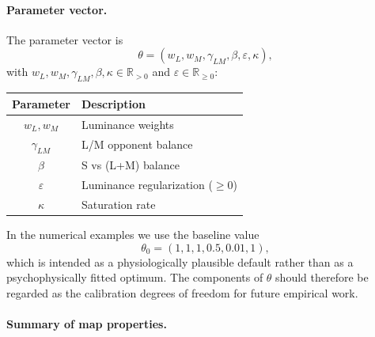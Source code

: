 \documentclass[11pt]{article}
\theoremstyle{plain}
\theoremstyle{definition}
\theoremstyle{remark}
\newcommand{\Rnn}{\mathbb{R}_{\geq 0}}  %
\newcommand{\Rpp}{\mathbb{R}_{> 0}}     %
\begin{document}
\paragraph{Parameter vector.}

The parameter vector is
\begin{equation}
\theta = (w_L, w_M, \gamma_{LM}, \beta, \varepsilon, \kappa),
\end{equation}
with $w_L, w_M, \gamma_{LM}, \beta, \kappa \in \Rpp$ and $\varepsilon \in \Rnn$:
\begin{center}
\begin{tabular}{cl}
\toprule
Parameter & Description \\
\midrule
$w_L, w_M$ & Luminance weights \\
$\gamma_{LM}$ & L/M opponent balance \\
$\beta$ & S vs (L+M) balance \\
$\varepsilon$ & Luminance regularization ($\geq 0$) \\
$\kappa$ & Saturation rate \\
\bottomrule
\end{tabular}
\end{center}
In the numerical examples we use the baseline value
\begin{equation}
\theta_0 = (1, 1, 1, 0.5, 0.01, 1),
\end{equation}
which is intended as a physiologically plausible default rather than as a psychophysically fitted optimum. The components of $\theta$ should therefore be regarded as the calibration degrees of freedom for future empirical work.

\paragraph{Summary of map properties.}
\end{document}
